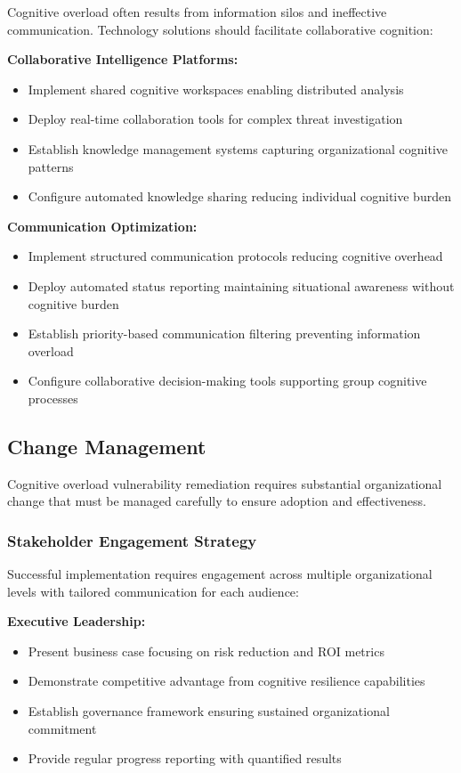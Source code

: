\documentclass[11pt,a4paper]{article}
\begin{document}
Cognitive overload often results from information silos and ineffective communication. Technology solutions should facilitate collaborative cognition:

\textbf{Collaborative Intelligence Platforms:}
\begin{itemize}
\item Implement shared cognitive workspaces enabling distributed analysis
\item Deploy real-time collaboration tools for complex threat investigation
\item Establish knowledge management systems capturing organizational cognitive patterns
\item Configure automated knowledge sharing reducing individual cognitive burden
\end{itemize}

\textbf{Communication Optimization:}
\begin{itemize}
\item Implement structured communication protocols reducing cognitive overhead
\item Deploy automated status reporting maintaining situational awareness without cognitive burden
\item Establish priority-based communication filtering preventing information overload
\item Configure collaborative decision-making tools supporting group cognitive processes
\end{itemize}

\subsection{Change Management}

Cognitive overload vulnerability remediation requires substantial organizational change that must be managed carefully to ensure adoption and effectiveness.

\subsubsection{Stakeholder Engagement Strategy}

Successful implementation requires engagement across multiple organizational levels with tailored communication for each audience:

\textbf{Executive Leadership:}
\begin{itemize}
\item Present business case focusing on risk reduction and ROI metrics
\item Demonstrate competitive advantage from cognitive resilience capabilities
\item Establish governance framework ensuring sustained organizational commitment
\item Provide regular progress reporting with quantified results
\end{itemize}
\end{document}
